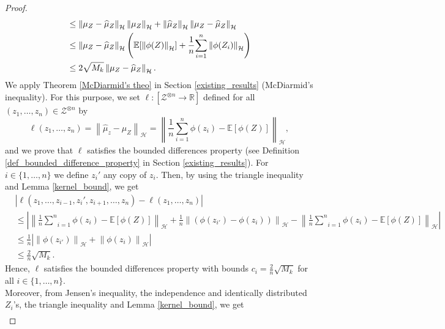\documentclass[twoside,11pt]{article}
\newcommand{\Hk}{\mathcal{H}}
\newcommand{\nb}{n}
\newcommand{\R}{\mathbb{R}}%
\newcommand{\EE}{\mathbb{E}}%
\begin{document}
\begin{proof}
\begin{align}
    & \leq  \left \| \mu_Z -  \widehat{\mu}_Z \right \|_{\Hk}  \left \| \mu_Z \right \|_{\Hk} +  \left \| \widehat{\mu}_Z \right \|_{\Hk}  \left \| \mu_Z -  \widehat{\mu}_Z \right \|_{\Hk} \notag  \\
    & \leq   \left \| \mu_Z -  \widehat{\mu}_Z \right \|_{\Hk} \left(  \EE[\left \|  \phi(Z)\right \|_{\Hk} ] + \frac{1}{n} \underset{i=1}{\overset{n}{\sum}} \left \|  \phi(Z_i)\right \|_{\Hk} \right) \notag \\
    & \leq   2 \sqrt{M_k} \left \| \mu_Z -  \widehat{\mu}_Z \right \|_{\Hk}. 
    \label{2_sqrt_Mk}
\end{align}
We apply Theorem \ref{McDiarmid's theo} in Section \ref{existing_results} (McDiarmid's inequality). For this purpose, we set $\ell : [\mathcal{Z}^{\otimes \nb} \longrightarrow \R]$ defined for all $\left(z_1,\ldots,z_{n}\right) \in \mathcal{Z}^{\otimes n}$ by $$    \ell\left(z_1,\ldots,z_{n}\right) = \left \| \widehat{\mu}_z - \mu_Z \right \|_{\Hk} = \left \| \frac{1}{n} \underset{i=1}{\overset{n}{\sum}}
     \phi(z_i) - \EE[\phi(Z)] \right \|_{\Hk},$$
and we prove that $\ell$ satisfies the bounded differences property (see Definition \ref{def_bounded_difference_property} in Section \ref{existing_results}). 
For $i \in \{1,\ldots,\nb\}$ we define $z_i'$ any copy of $z_i$. Then, by using the triangle inequality and Lemma \ref{kernel_bound}, we get 
\begin{align*}
    & \left | \ell\left(z_1,\ldots,z_{i-1},z_i',z_{i+1},\ldots,z_{n}\right) - \ell\left(z_1,\ldots,z_{n}\right) \right | \\
     &\leq \left |  \left \| \frac{1}{n} \underset{i=1}{\overset{n}{\sum}}
     \phi(z_i) - \EE[\phi(Z)] \right \|_{\Hk} +   \frac{1}{n} \left \| \left( \phi(z_{i'}) - \phi(z_i) \right)\right \|_{\Hk} - \left \| \frac{1}{n} \underset{i=1}{\overset{n}{\sum}}
     \phi(z_i) - \EE[\phi(Z)] \right \|_{\Hk} \right | \\
     & \leq \frac{1}{n} \left | \left \| \phi(z_{i'}) \right \|_{\Hk} + \left \| \phi(z_i) \right \|_{\Hk} \right | \\
     & \leq \frac{2}{n} \sqrt{M_k}.
\end{align*}
Hence, $\ell$ satisfies the bounded differences property with bounds $c_i=\frac{2}{n} \sqrt{M_k}$ for all $i \in \{1,\ldots,n\}$. \\
Moreover, from Jensen's inequality, the independence and identically distributed $Z_i$'s, the triangle inequality and  Lemma \ref{kernel_bound}, we get 
\begin{align*}

\end{align*}
\end{proof}
\end{document}
